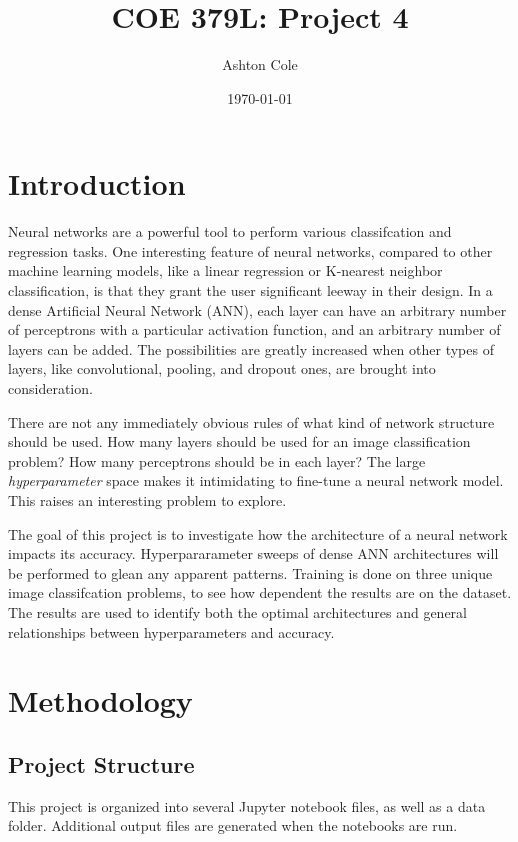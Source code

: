 \documentclass{article}
\title{COE 379L: Project 4}
\author{Ashton Cole}
\date{\today}
\begin{document}
\maketitle

\section{Introduction}

Neural networks are a powerful tool to perform various classifcation and regression tasks. One interesting feature of neural networks, compared to other machine learning models, like a linear regression or K-nearest neighbor classification, is that they grant the user significant leeway in their design. In a dense Artificial Neural Network (ANN), each layer can have an arbitrary number of perceptrons with a particular activation function, and an arbitrary number of layers can be added. The possibilities are greatly increased when other types of layers, like convolutional, pooling, and dropout ones, are brought into consideration.

There are not any immediately obvious rules of what kind of network structure should be used. How many layers should be used for an image classification problem? How many perceptrons should be in each layer? The large \emph{hyperparameter} space makes it intimidating to fine-tune a neural network model. This raises an interesting problem to explore.

The goal of this project is to investigate how the architecture of a neural network impacts its accuracy. Hyperpararameter sweeps of dense ANN architectures will be performed to glean any apparent patterns. Training is done on three unique image classifcation problems, to see how dependent the results are on the dataset. The results are used to identify both the optimal architectures and general relationships between hyperparameters and accuracy.

\section{Methodology}

\subsection{Project Structure}

This project is organized into several Jupyter notebook files, as well as a data folder. Additional output files are generated when the notebooks are run.
\end{document}
